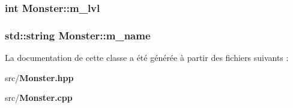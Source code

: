 \subsubsection[{m\-\_\-lvl}]{\setlength{\rightskip}{0pt plus 5cm}int Monster\-::m\-\_\-lvl\hspace{0.3cm}{\ttfamily [private]}}\label{class_monster_a8d1a55805e6607e882fc4da49fabacf0}
\subsubsection[{m\-\_\-name}]{\setlength{\rightskip}{0pt plus 5cm}std\-::string Monster\-::m\-\_\-name\hspace{0.3cm}{\ttfamily [private]}}\label{class_monster_ad5775421b7be86132f4e2e9df81a7d2b}


La documentation de cette classe a été générée à partir des fichiers suivants \-:\begin{DoxyCompactItemize}
\item 
src/{\bf Monster.\-hpp}\item 
src/{\bf Monster.\-cpp}\end{DoxyCompactItemize}
